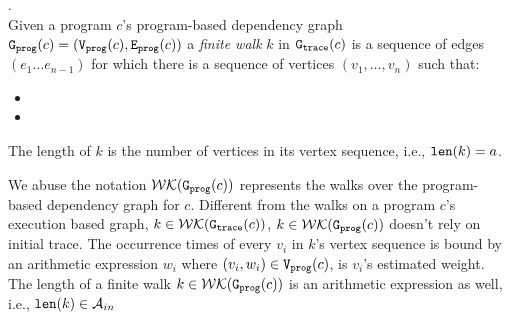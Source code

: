 \begin{defn}.
  \label{def:prog_finitewalk}
  \\
  Given a program $c$'s program-based dependency graph 
  $\mathtt{{G_{prog}}}({c}) = (\mathtt{{V_{prog}}}(c), \mathtt{{E_{prog}}}(c))$
  a \emph{finite walk} $k$ in $\mathtt{{G_{trace}}}({c})$ is
  a sequence of edges $(e_1 \ldots e_{n - 1})$ 
  for which there is a sequence of vertices 
  $(v_1, \ldots, v_{n})$ such that:
  \begin{itemize}
      \item 
      \item 
  \end{itemize}
  The length of $k$ is the number of vertices in its vertex sequence, i.e., $\mathtt{len}(k) = a$.
 \end{defn}
  We abuse the notation $\mathcal{WK}(\mathtt{{G_{prog}}}(c))$ represents the walks over the program-based dependency graph for $c$.
Different from the walks on a program $c$'s execution based graph,
 $k \in \mathcal{WK}(\mathtt{{G_{trace}}}(c))$, 
$k \in \mathcal{WK}(\mathtt{{G_{prog}}}(c))$ doesn't rely on initial trace.
The occurrence times of every $v_i $ in $k$'s vertex sequence is bound by 
an arithmetic expression $w_i$ where $(v_i, w_i) \in \mathtt{{V_{prog}}}(c)$, is $v_i$'s estimated weight. 
 The length of a finite walk $k \in \mathcal{WK}(\mathtt{{G_{prog}}}(c))$ is an arithmetic expression
 as well, i.e., $\mathtt{len}(k) \in \mathcal{A}_{in}$

